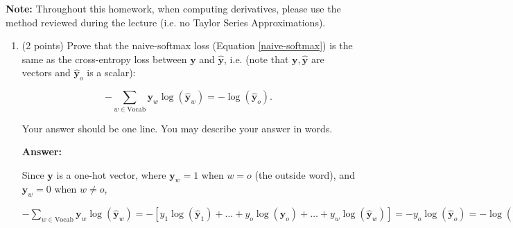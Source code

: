 \documentclass{article}
\newenvironment{answer}{
    {\bf Answer:} \sf \begingroup\color{red}
}{\endgroup}%
\begin{document}
\textbf{Note:} Throughout this homework, when computing derivatives, please use the method reviewed during the lecture (i.e. no Taylor Series Approximations).

\clearpage 
\begin{enumerate}[label=(\alph*)]
\item (2 points) 
Prove that the naive-softmax loss (Equation \ref{naive-softmax}) is the same as the cross-entropy loss between $\bm y$ and $\hat{\bm y}$, i.e. (note that $\bm y, \hat{\bm y}$ are vectors and $\hat{\bm y}_o$ is a scalar):

\begin{equation} 
-\sum_{w \in \text{Vocab}} \bm y_w \log(\hat{\bm y}_w) = - \log (\hat{\bm y}_o).
\end{equation}

Your answer should be one line. You may describe your answer in words.
\begin{shaded}
\begin{answer}
Since $\bm y$ is a one-hot vector, where $\bm y_w = 1$ when $w = o$ (the outside word), and $\bm y_w = 0$ when $w \neq o$,

$-\sum_{w \in \text{Vocab}} \bm y_w \log(\hat{\bm y}_w) = -[y_1\log(\hat{\bm y}_1) + \ldots + y_o\log(\hat{\bm y}_o) + \ldots + y_w\log(\hat{\bm y}_w)] = -y_o\log(\hat{\bm y}_o) = -\log(\hat{\bm y}_o)$
\end{answer}
\end{shaded}


\end{enumerate}
\end{document}
